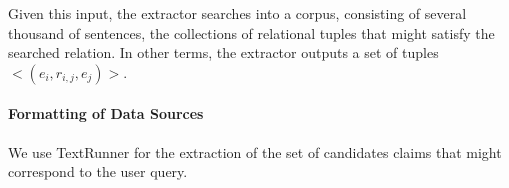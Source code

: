 Given this input, the extractor searches into a corpus, consisting
of several thousand of sentences, the collections of relational tuples that might satisfy the searched relation.
In other terms, the extractor outputs a set of tuples $<(e_i, r_{i,j}, e_j)>$.

\paragraph*{Formatting of Data Sources}
We use TextRunner for the extraction of the set of 
candidates claims that might correspond to the user query.